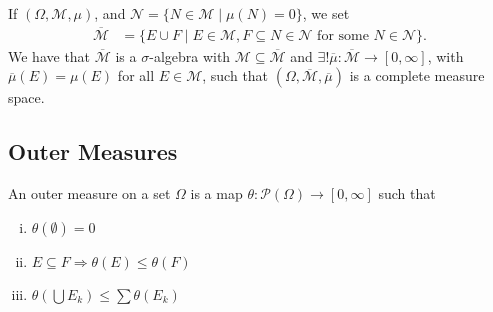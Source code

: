 \documentclass[10pt]{extarticle}
\begin{document}
  If $(\Omega,\mathcal{M},\mu)$, and $\mathcal{N} = \{N\in \mathcal{M}\mid \mu(N) = 0\}$, we set
  \begin{align*}
    \overline{\mathcal{M}} &= \{E\cup F\mid E\in \mathcal{M},F\subseteq N\in \mathcal{N}\text{ for some $N\in \mathcal{N}$}\}.
  \end{align*}
  We have that $ \overline{\mathcal{M}} $ is a $\sigma$-algebra with $\mathcal{M}\subseteq \overline{\mathcal{M}}$ and $\exists! \overline{\mu}: \overline{\mathcal{M}}\rightarrow [0,\infty]$, with $\overline{\mu}(E) = \mu(E)$ for all $E\in \mathcal{M}$, such that $(\Omega, \overline{\mathcal{M}},\overline{\mu})$ is a complete measure space.
  \subsection{Outer Measures}%
  An outer measure on a set $\Omega$ is a map $\theta: \mathcal{P}(\Omega)\rightarrow [0,\infty]$ such that
  \begin{enumerate}[(i)]
    \item $\theta(\emptyset) = 0$
    \item $E\subseteq F \Rightarrow \theta(E) \leq \theta(F)$
    \item $\theta\left(\bigcup E_k\right) \leq \sum \theta(E_k)$
  \end{enumerate}
\end{document}
